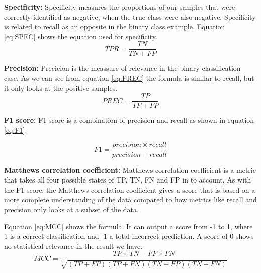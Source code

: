 \vspace{5px}
\textbf{Specificity:} Specificity measures the proportions of our samples that were correctly identified as negative, when the true class were also negative. 
Specificity is related to recall as an opposite in the binary class example.
Equation \ref{eq:SPEC} shows the equation used for specificity.
\begin{equation}
TPR=\frac{TN}{TN+FP}
\label{eq:SPEC}
\end{equation}



\vspace{5px}
\textbf{Precision:}
Precicion is the meassure of relevance in the binary classification case.
As we can see from equation \ref{eq:PREC} the formula is similar to recall, but it only looks at the positive samples. 
\begin{equation}
PREC=\frac{TP}{TP+FP}
\label{eq:PREC}
\end{equation}



\vspace{5px}
\textbf{F1 score:}
F1 score is a combination of precision and recall as shown in equation \ref{eq:F1}.

\begin{equation}
F1=\frac{precision \times recall}{precision + recall}
\label{eq:F1}
\end{equation}



\vspace{5px}
\textbf{Matthews correlation coefficient:}
Matthews correlation coefficient is a metric that takes all four possible states of TP, TN, FN and FP in to account. As with the F1 score, the Matthews correlation coefficient gives a score that is based on a more complete understanding of the data compared to how metrics like recall and precision only looks at a subset of the data.

Equation \ref{eq:MCC} shows the formula. It can output a score from -1 to 1, where 1 is a correct classification and -1 a total incorrect prediction. A score of 0 shows no statistical relevance in the result we have.
\begin{equation}
MCC=\frac{TP \times TN - FP \times FN}{\sqrt{(TP + FP)(TP + FN)(TN + FP)(TN + FN)}}
\label{eq:MCC}
\end{equation}







